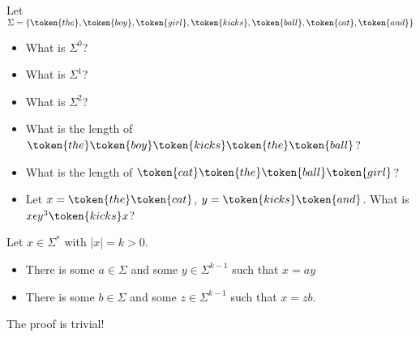 \newpage
\newcommand\tokthe{\token{the}}
\newcommand\tokboy{\token{boy}}
\newcommand\tokgirl{\token{girl}}
\newcommand\tokkicks{\token{kicks}}
\newcommand\tokball{\token{ball}}
\newcommand\tokcat{\token{cat}}
\newcommand\tokand{\token{and}}
\begin{ex}
 Let $\Sigma = \{ \tokthe, \tokboy, \tokgirl, \tokkicks, \tokball, \tokcat, \tokand \}$
 \begin{itemize}
  \item What is $\Sigma^0$?
  \item What is $\Sigma^1$?
  \item What is $\Sigma^2$?
  \item What is the length of $\tokthe \tokboy \tokkicks \tokthe \tokball$?
  \item What is the length of $\tokcat \tokthe \tokball \tokgirl$?
  \item Let $x = \tokthe\tokcat$, $y=\tokkicks\tokand$. What is $x\epsilon
  y^3\tokkicks x$?
 \end{itemize}
\end{ex}


\newpage
\begin{prop}
 Let $x \in \Sigma^*$ with $|x| = k > 0$.
 \begin{itemize}
  \item There is some $a\in\Sigma$ and some
  $y \in \Sigma^{k-1}$ such that $x=ay$
  \item There is some $b \in \Sigma$ and some $z \in
  \Sigma^{k-1}$ such that $x = zb$.
 \end{itemize}
 The proof is trivial!
\end{prop}
